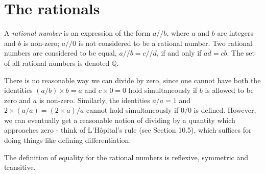 \section{The rationals}\label{sec 4.2}

\begin{definition}\label{4.2.1}
A \emph{rational number} is an expression of the form \(a // b\), where \(a\) and \(b\) are integers and \(b\) is non-zero;
\(a // 0\) is not considered to be a rational number.
Two rational numbers are considered to be equal, \(a // b = c // d\), if and only if \(ad = cb\).
The set of all rational numbers is denoted \(\mathds{Q}\).
\end{definition}

\begin{note}
There is no reasonable way we can divide by zero, since one cannot have both the identities \((a / b) \times b = a\) and \(c \times 0 = 0\) hold simultaneously if \(b\) is allowed to be zero and \(a\) is non-zero.
Similarly, the identities \(a / a = 1\) and \(2 \times (a / a) = (2 \times a) / a\) cannot hold simultaneously if \(0 / 0\) is defined.
However, we can eventually get a reasonable notion of dividing by a quantity which approaches zero
- think of L'H\^opital's rule (see Section 10.5), which suffices for doing things like defining differentiation.
\end{note}

\begin{additional corollary}\label{ac 4.2.1}
The definition of equality for the rational numbers is reflexive, symmetric and transitive.
\end{additional corollary}

